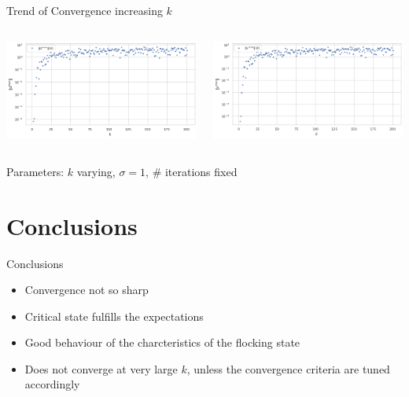 \documentclass{beamer}
\begin{document}
\begin{frame}{Trend of Convergence increasing $k$}
	\begin{minipage}[0.95\textheight]{\textwidth}
	\begin{columns}[T]
	\begin{column}{0.50\textwidth}
	\includegraphics[width=\textwidth, keepaspectratio]{../images/d_conv_N.png}
	\end{column}
	\begin{column}{0.50\textwidth}
	\includegraphics[width=\textwidth, keepaspectratio]{../images/v_conv_N.png}
	\end{column}
	\end{columns}
	\end{minipage}
	\begin{center}
		Parameters: $k$ varying, $\sigma=1$, \# iterations fixed
	\end{center}
\end{frame}
\section{Conclusions}
\begin{frame}{Conclusions}
	\begin{itemize}
		\item Convergence not so sharp
		\vspace{0.5cm}
		\item Critical state fulfills the expectations
		\vspace{0.5cm}
		\item Good behaviour of the charcteristics of the flocking state
		\vspace{0.5cm}
		\item Does not converge at very large $k$, unless the convergence criteria are tuned accordingly
	\end{itemize}
\end{frame}
\end{document}
